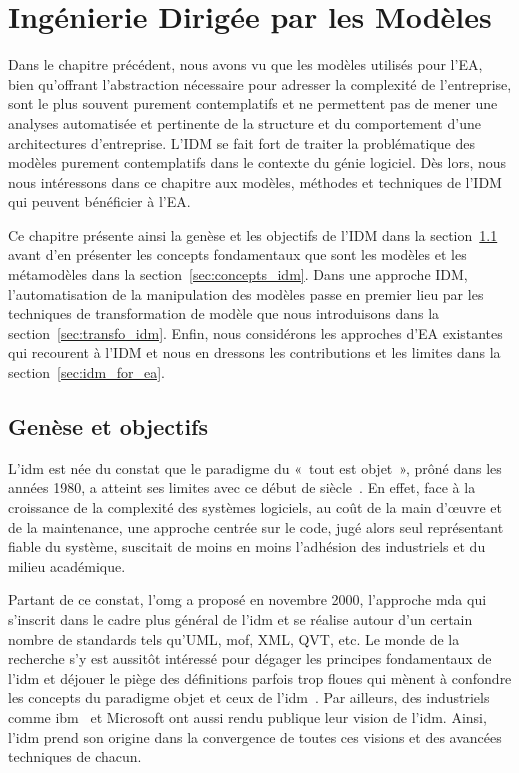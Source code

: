 \chapter{Ingénierie Dirigée par les Modèles}
\label{ch:IDM}
 
\PartialToc

Dans le chapitre précédent, nous avons vu que les modèles utilisés pour l'EA,
bien qu'offrant l'abstraction nécessaire pour adresser la complexité de l'entreprise, sont le
plus souvent purement contemplatifs et ne permettent pas de mener une analyses automatisée et pertinente 
de la structure et du comportement d'une architectures d'entreprise. L'IDM se fait fort de traiter la problématique
des modèles purement contemplatifs dans le contexte du génie logiciel. Dès lors, nous nous intéressons dans ce chapitre 
aux modèles, méthodes et techniques de l'IDM qui peuvent bénéficier à l'EA.


Ce chapitre présente ainsi la genèse et les objectifs de l'IDM dans la section~\ref{sec:genese_idm} avant 
d'en présenter les concepts fondamentaux que sont les modèles et les métamodèles
dans la section~\ref{sec:concepts_idm}. Dans une approche IDM, l'automatisation de la manipulation des modèles passe en premier
lieu par les techniques de transformation de modèle que nous introduisons dans la section~\ref{sec:transfo_idm}. Enfin, nous considérons
les approches d'EA existantes qui recourent à l'IDM et nous en dressons les contributions et les limites dans la section~\ref{sec:idm_for_ea}. 

\section{Genèse et objectifs}
\label{sec:genese_idm}

L'\gls{idm} est née du constat que le paradigme du «~tout est objet~», prôné dans les années 1980, a atteint ses limites avec ce début de siècle~\cite{greenfield2004software}. En effet, face à la croissance de la complexité des systèmes logiciels, au coût de la main d'œuvre et de la maintenance, une approche centrée sur le code, jugé alors seul représentant 
fiable du système, suscitait de moins en moins l'adhésion des industriels et du 
milieu académique. 

Partant de ce constat, l'\gls{omg} a proposé en novembre 
2000, l'approche \gls{mda} qui s'inscrit dans le cadre 
plus général de l'\gls{idm} et se réalise autour d'un certain nombre de standards tels 
qu'UML, \gls{mof}, XML, QVT, etc. Le monde de la recherche s'y est aussitôt intéressé 
pour dégager les principes fondamentaux de l'\gls{idm} 
\cite{bezivin2001towards, kent2002model, de2002using} et déjouer le 
piège des définitions parfois trop floues qui mènent à confondre les 
concepts du paradigme objet et ceux de l'\gls{idm}~\cite{bezivin2004search}. Par 
ailleurs, des industriels comme \gls{ibm}~\cite{booch2004mda} et Microsoft 
\cite{greenfield2004software} ont aussi rendu publique leur vision de l'\gls{idm}. 
Ainsi, l'\gls{idm} prend son origine dans la convergence de toutes ces visions et des 
avancées techniques de chacun.

